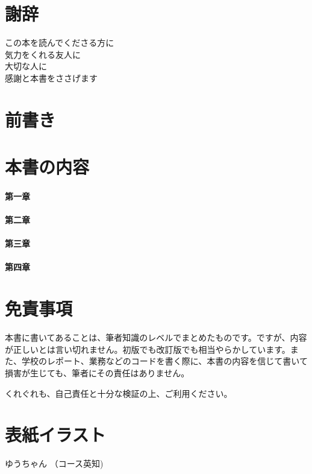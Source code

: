 \section*{謝辞}
\begin{center}
この本を読んでくださる方に \\
気力をくれる友人に \\
大切な人に \\
感謝と本書をささげます
\end{center}

\section*{前書き}





\section*{本書の内容}

\paragraph{第一章}

\paragraph{第二章}

\paragraph{第三章}

\paragraph{第四章}


\section*{免責事項}
本書に書いてあることは、筆者知識のレベルでまとめたものです。ですが、内容が正しいとは言い切れません。初版でも改訂版でも相当やらかしています。また、学校のレポート、業務などのコードを書く際に、本書の内容を信じて書いて損害が生じても、筆者にその責任はありません。

くれぐれも、自己責任と十分な検証の上、ご利用ください。

\section*{表紙イラスト}
ゆうちゃん （コース英知)
